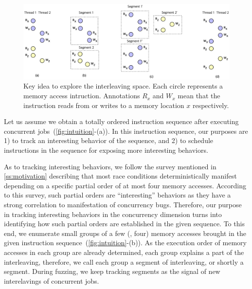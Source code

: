 \begin{figure}[t]
  \includegraphics[width=0.9\linewidth]{fig/intuition.pdf}
  \caption{Key idea to explore the interleaving space. Each circle
    represents a memory access intruction. Annotations $R_x$ and $W_x$
    mean that the instruction reads from or writes to a memory
    location $x$ respectively.}
  \label{fig:intuition}
\end{figure}


%
Let us assume we obtain a totally ordered instruction sequence after
executing concurrent jobs~(\autoref{fig:intuition}-(a)).
%
In this instruction sequence, our purposes are 1) to track an
interesting behavior of the sequence, and 2) to schedule instructions
in the sequence for exposing more interesting behaviors.


As to tracking interesting behaviors, we follow the survey mentioned
in \autoref{ss:motivation} describing that most race conditions
deterministically manifest depending on a specific partial order of at
most four memory accesses.
%
According to this survey, such partial orders are ``interesting''
behaviors as they have a strong correlation to manifestation of
concurrency bugs.
%
Therefore, our purpose in tracking interesting behaviors in the
concurrency dimension turns into identifying how such partial orders
are established in the given sequence.
%
To this end, we enumerate small groups of a few (\eg, four) memory
accesses brought in the given instruction
sequence~(\autoref{fig:intuition}-(b)).
%
As the execution order of memory accesses in each group are already
determined, each group explains a part of the interleaving, therefore,
we call each group a segment of interleaving, or shortly a segment.
%
During fuzzing, we keep tracking segments as the signal of new
interelavings of concurrent jobs.





